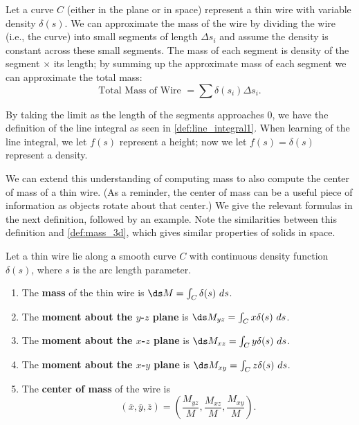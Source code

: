 Let a curve $C$ (either in the plane or in space) represent a thin wire with variable density $\delta(s)$. We can approximate the mass of the wire by dividing the wire (i.e., the curve) into small segments of length $\Delta s_i$ and assume the density is constant across these small segments. The mass of each segment is density of the segment $\times$ its length; by summing up the approximate mass of each segment we can approximate the total mass:
\[\text{Total Mass of Wire } = \sum \delta(s_i)\Delta s_i.\]

By taking the limit as the length of the segments approaches 0, we have the definition of the line integral as seen in \autoref{def:line_integral1}. When learning of the line integral, we let $f(s)$ represent a height; now we let $f(s) = \delta(s)$ represent a density.

We can extend this understanding of computing mass to also compute the center of mass of a thin wire. (As a reminder, the center of mass can be a useful piece of information as objects rotate about that center.) We give the relevant formulas in the next definition, followed by an example. Note the similarities between this definition and \autoref{def:mass_3d}, which gives similar properties of solids in space.

{Let a thin wire lie along a smooth curve $C$ with continuous density function $\delta(s)$, where $s$ is the arc length parameter. 	%
\begin{enumerate}
	\item The \textbf{mass} of the thin wire is $\ds M = \int_C \delta(s)\ ds$.
	\item	The \textbf{moment about the $y$-$z$ plane} is $\ds M_{yz} = \int_C x\delta(s)\ ds$.
	
	\item	The \textbf{moment about the $x$-$z$ plane} is $\ds M_{xz} = \int_C y\delta(s)\ ds$.
	\item	The \textbf{moment about the $x$-$y$ plane} is $\ds M_{xy} = \int_C z\delta(s)\ ds$.
	\item The \textbf{center of mass} of the wire is
	\[
	(\overline{x},\overline{y},\overline{z})
	= \left(\frac{M_{yz}}M, \frac{M_{xz}}M,\frac{M_{xy}}M\right).
	\]
\end{enumerate}}

